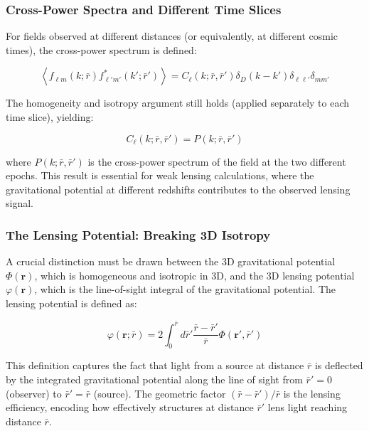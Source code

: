 \subsubsection{Cross-Power Spectra and Different Time Slices}

For fields observed at different distances (or equivalently, at different cosmic times), the cross-power spectrum is defined:

\begin{equation}
\left\langle f_{\ell m}(k; \bar{r}) f_{\ell' m'}^*(k'; \bar{r}') \right\rangle = C_\ell(k; \bar{r}, \bar{r}') \delta_D(k - k') \delta_{\ell\ell'} \delta_{m m'}
\label{eq:cross_power_def}
\end{equation}

The homogeneity and isotropy argument still holds (applied separately to each time slice), yielding:

\begin{equation}
C_\ell(k; \bar{r}, \bar{r}') = P(k; \bar{r}, \bar{r}')
\label{eq:cross_power_result}
\end{equation}

where $P(k; \bar{r}, \bar{r}')$ is the cross-power spectrum of the field at the two different epochs. This result is essential for weak lensing calculations, where the gravitational potential at different redshifts contributes to the observed lensing signal.

\subsubsection{The Lensing Potential: Breaking 3D Isotropy}

A crucial distinction must be drawn between the 3D gravitational potential $\Phi(\mathbf{r})$, which is homogeneous and isotropic in 3D, and the 3D lensing potential $\varphi(\mathbf{r})$, which is the line-of-sight integral of the gravitational potential. The lensing potential is defined as:

\begin{equation}
\varphi(\mathbf{r}; \bar{r}) = 2 \int_0^{\bar{r}} d\bar{r}' \frac{\bar{r} - \bar{r}'}{\bar{r}} \Phi(\mathbf{r}', \bar{r}')
\label{eq:lensing_potential}
\end{equation}

This definition captures the fact that light from a source at distance $\bar{r}$ is deflected by the integrated gravitational potential along the line of sight from $\bar{r}' = 0$ (observer) to $\bar{r}' = \bar{r}$ (source). The geometric factor $(\bar{r} - \bar{r}')/\bar{r}$ is the lensing efficiency, encoding how effectively structures at distance $\bar{r}'$ lens light reaching distance $\bar{r}$.

